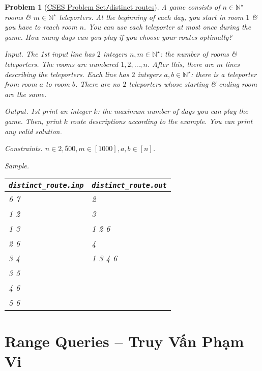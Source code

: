 \documentclass{article}
\newtheorem{problem}{Problem}
\begin{document}
\begin{problem}[\href{https://cses.fi/problemset/task/1711}{CSES Problem Set{\tt/}distinct routes}]
    A game consists of $n\in\mathbb{N}^\star$ rooms \& $m\in\mathbb{N}^\star$ teleporters. At the beginning of each day, you start in room $1$ \& you have to reach room $n$. You can use each teleporter at most once during the game. How many days can you play if you choose your routes optimally?
    \item {\sf Input.} The 1st input line has $2$ integers $n,m\in\mathbb{N}^\star$: the number of rooms \& teleporters. The rooms are numbered $1,2,\ldots,n$. After this, there are $m$ lines describing the teleporters. Each line has $2$ integers $a,b\in\mathbb{N}^\star$: there is a teleporter from room $a$ to room $b$. There are no $2$ teleporters whose starting \& ending room are the same.
    \item {\sf Output.} 1st print an integer $k$: the maximum number of days you can play the game. Then, print $k$ route descriptions according to the example. You can print any valid solution.
    \item {\sf Constraints.} $n\in\overline{2,500},m\in[1000],a,b\in[n]$.
    \item {\sf Sample.}
    \begin{table}[H]
        \centering
        \begin{tabular}{|l|l|}
            \hline
            \verb|distinct_route.inp| & \verb|distinct_route.out| \\
            \hline
            6 7 & 2 \\
            1 2 & 3 \\
            1 3 & 1 2 6 \\
            2 6 & 4 \\
            3 4 & 1 3 4 6 \\
            3 5 & \\
            4 6 & \\
            5 6 & \\
            \hline
        \end{tabular}
    \end{table}
\end{problem}


\section{Range Queries -- Truy Vấn Phạm Vi}
\end{document}
